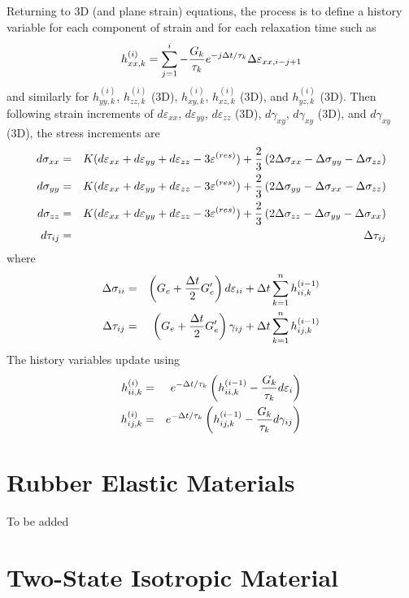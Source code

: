 \documentclass[11pt]{article}
\def\e#1{\varepsilon_{#1}}
\def\er#1{\varepsilon_{#1}^{(res)}}
\def\g#1{\gamma_{#1}}
\def\s#1{\sigma_{#1}}
\def\t#1{\tau_{#1}}
\begin{document}
Returning to 3D (and plane strain) equations, the process is to define a history variable for each component of strain and for each relaxation time such as
\begin{equation}
      h_{xx,k}^{(i)} = \sum_{j=1}^{i}  -{G_k\over\tau_k} e^{-j\Delta t/\tau_k}\Delta \e{xx,i-j+1}
\end{equation}
and similarly for $h_{yy,k}^{(i)}$,  $h_{zz,k}^{(i)}$ (3D), $h_{xy,k}^{(i)}$,  $h_{xz,k}^{(i)}$ (3D),  and $h_{yz,k}^{(i)}$ (3D). Then following strain increments of $d\e{xx}$, $d\e{yy}$,  $d\e{zz}$ (3D), $d\g{xy}$, $d\g{xy}$ (3D), and $d\g{xy}$ (3D), the stress increments are
\begin{eqnarray}
      d\s{xx} & = & K(d\e{xx} + d\e{yy} + d\e{zz} - 3\er{}) + {2\over 3}\left(2\Delta\s{xx} - \Delta\s{yy} - \Delta\s{zz}\right) \\
      d\s{yy} & = & K(d\e{xx} + d\e{yy} + d\e{zz} - 3\er{}) + {2\over 3}\left(2\Delta\s{yy} - \Delta\s{xx}- \Delta\s{zz}\right) \\
      d\s{zz} & = & K(d\e{xx} +d\e{yy} + d\e{zz} - 3\er{}) + {2\over 3}\left(2\Delta\s{zz} -\Delta\s{yy} - \Delta\s{xx}\right) \\
      d \t{ij} & = & \Delta\t{ij} 
\end{eqnarray}
where
\begin{eqnarray}
          \Delta \s{ii} & = & \left(G_e + {\Delta t\over 2}G_e'\right) d\e{ii}
                          + \Delta t  \sum_{k=1}^n h_{ii,k}^{(i-1)}     \\
          \Delta \t{ij} & = & \left(G_e + {\Delta t\over 2}G_e'\right) \g{ij}
                          + \Delta t  \sum_{k=1}^n h_{ij,k}^{(i-1)} 
\end{eqnarray}
The history variables update using
\begin{eqnarray}
        h_{ii,k}^{(i)}   & = & e^{-\Delta t/\tau_k}\left(h_{ii,k}^{(i-1)} - {G_k\over\tau_k}d\e{i}\right)  \\
        h_{ij,k}^{(i)}   & = & e^{-\Delta t/\tau_k}\left(h_{ij,k}^{(i-1)} - {G_k\over\tau_k}d\g{ij}\right)
\end{eqnarray}

\section{Rubber Elastic Materials}

To be added

\section{Two-State Isotropic Material}
\end{document}
